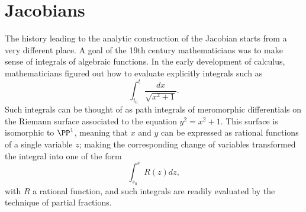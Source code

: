 %
%
%

\section{Jacobians}

The history leading to the analytic construction of the Jacobian starts from a very different place. A goal of the 19th century mathematicians was  to make sense of integrals of algebraic functions. In the early development of calculus, mathematicians figured out how to evaluate explicitly integrals such as
$$
\int_{t_0}^t \frac{dx}{\sqrt{x^2+1}}.
$$
Such integrals can be thought of as path integrals of meromorphic differentials on the Riemann surface associated to the equation $y^2 = x^2+1$. This surface is isomorphic to $\PP^1$, meaning that $x$ and $y$ can be expressed as rational functions of a single variable $z$; making the corresponding change of variables transformed the integral into one of the form
$$
\int_{s_0}^s R(z)dz,
$$
with $R$ a rational function, and such integrals are readily evaluated by the technique of partial fractions.

